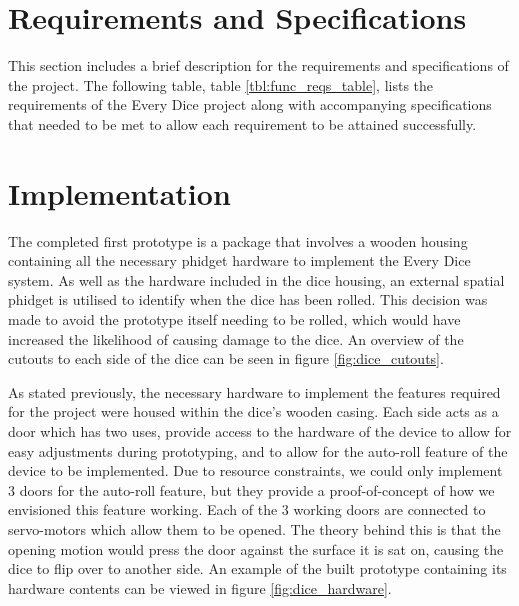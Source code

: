 \documentclass{sigchi}
\begin{document}
\section{Requirements and Specifications}

  This section includes a brief description for the requirements and specifications of the project. The following table, table \ref{tbl:func_reqs_table}, lists the requirements of the Every Dice project along with accompanying specifications that needed to be met to allow each requirement to be attained successfully.

  \onecolumn
  \vspace{2em}
  

\twocolumn
\section{Implementation}

  The completed first prototype is a package that involves a wooden housing containing all the necessary phidget hardware to implement the Every Dice system. As well as the hardware included in the dice housing, an external spatial phidget is utilised to identify when the dice has been rolled. This decision was made to avoid the prototype itself needing to be rolled, which would have increased the likelihood of causing damage to the dice. An overview of the cutouts to each side of the dice can be seen in figure \ref{fig:dice_cutouts}.

  

  As stated previously, the necessary hardware to implement the features required for the project were housed within the dice's wooden casing. Each side acts as a door which has two uses, provide access to the hardware of the device to allow for easy adjustments during prototyping, and to allow for the auto-roll feature of the device to be implemented. Due to resource constraints, we could only implement 3 doors for the auto-roll feature, but they provide a proof-of-concept of how we envisioned this feature working. Each of the 3 working doors are connected to servo-motors which allow them to be opened. The theory behind this is that the opening motion would press the door against the surface it is sat on, causing the dice to flip over to another side. An example of the built prototype containing its hardware contents can be viewed in figure \ref{fig:dice_hardware}.

  
\end{document}
